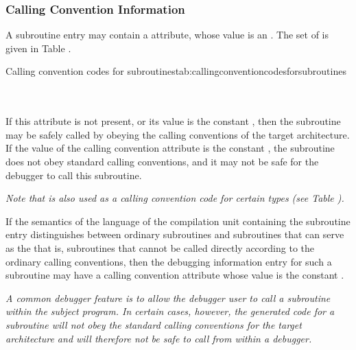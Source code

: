 \subsubsection{Calling Convention Information}
\hypertarget{chap:DWATcallingconventionforsubprograms}{}
A subroutine entry may contain a 
\DWATcallingconventionDEFN{}
attribute, whose value is an 
. The set of
is given in Table .

\begin{simplenametable}[1.4in]{Calling convention codes for subroutines}{tab:callingconventioncodesforsubroutines}
\DWCCnormal        \\
\DWCCprogram       \\
\DWCCnocall        \\
\end{simplenametable}

If this attribute is not present, or its value is the constant
\DWCCnormalTARG, then the subroutine may be safely called by
obeying the  calling conventions of the target
architecture. If the value of the calling convention attribute
is the constant \DWCCnocallTARG, the subroutine does not obey
standard calling conventions, and it may not be safe for the
debugger to call this subroutine.

\textit{Note that \DWCCnormal{} is also used as a calling convention 
code for certain types 
(see Table ).}

If the semantics of the language of the compilation unit
containing the subroutine entry distinguishes between ordinary
subroutines and subroutines that can serve as the  that is, subroutines that cannot be called
directly according to the ordinary calling conventions,
then the debugging information entry for such a subroutine
may have a calling convention attribute whose value is the
constant \DWCCprogramTARG.

\textit{A common debugger feature is to allow the debugger user to call
a subroutine within the subject program. In certain cases,
however, the generated code for a subroutine will not obey
the standard calling conventions for the target architecture
and will therefore not be safe to call from within a debugger.}

